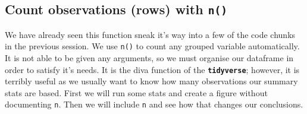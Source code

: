 \documentclass[]{book}
\newenvironment{Shaded}{\begin{snugshade}}{\end{snugshade}}
\newcommand{\KeywordTok}[1]{\textcolor[rgb]{0.13,0.29,0.53}{\textbf{#1}}}
\newcommand{\DataTypeTok}[1]{\textcolor[rgb]{0.13,0.29,0.53}{#1}}
\newcommand{\DecValTok}[1]{\textcolor[rgb]{0.00,0.00,0.81}{#1}}
\newcommand{\StringTok}[1]{\textcolor[rgb]{0.31,0.60,0.02}{#1}}
\newcommand{\OperatorTok}[1]{\textcolor[rgb]{0.81,0.36,0.00}{\textbf{#1}}}
\newcommand{\NormalTok}[1]{#1}
\theoremstyle{definition}
\theoremstyle{definition}
\theoremstyle{definition}
\theoremstyle{remark}
\begin{document}
\subsection{\texorpdfstring{Count observations (rows) with
\texttt{n()}}{Count observations (rows) with n()}}\label{count-observations-rows-with-n}

We have already seen this function sneak it's way into a few of the code
chunks in the previous session. We use \texttt{n()} to count any grouped
variable automatically. It is not able to be given any arguments, so we
must organise our dataframe in order to satisfy it's needs. It is the
diva function of the \textbf{\texttt{tidyverse}}; however, it is
terribly useful as we usually want to know how many observations our
summary stats are based. First we will run some stats and create a
figure without documenting \texttt{n}. Then we will include \texttt{n}
and see how that changes our conclusions.

\begin{Shaded}
\end{Shaded}
\end{document}
